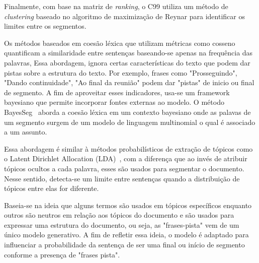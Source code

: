 Finalmente, com base na matriz de \textit{ranking}, o C99 utiliza um método de \textit{clustering} baseado no algoritmo de maximização de Reynar para identificar os limites entre os segmentos. 














Os métodos baseados em coesão léxica que utilizam métricas como cosseno quantificam a similaridade entre sentenças baseando-se apenas na frequência das palavras, Essa abordagem, ignora certas características do texto que podem dar pistas sobre a estrutura do texto. Por exemplo, frases como "Prosseguindo", "Dando continuidade", "Ao final da reunião" podem dar "pistas" de inicio ou final de segmento. A fim de aproveitar esses indicadores, usa-se um framework bayesiano que permite incorporar fontes externas ao modelo. O método BayesSeg~\cite{Eisenstein2008} aborda a coesão léxica em um contexto bayesiano onde as palavas de um segmento surgem de um modelo de linguagem multinomial o qual é associado a um assunto. 

Essa abordagem é similar à métodos probabilísticos de extração de tópicos como o Latent Dirichlet Allocation (LDA)~\cite{Blei2003}, com a diferença que ao invés de atribuir tópicos ocultos a cada palavra, esses são usados para segmentar o documento. Nesse sentido, detecta-se um limite entre sentenças quando a distribuição de tópicos entre elas for diferente.

Baseia-se na ideia que alguns termos são usados em tópicos específicos enquanto outros são neutros em relação aos tópicos do documento e são usados para expressar uma estrutura do documento, ou seja, as "frases-pista" vem de um único modelo generativo. A fim de refletir essa ideia, o modelo é adaptado para influenciar a probabilidade da sentença de ser uma final ou início de segmento conforme a presença de "frases pista".











